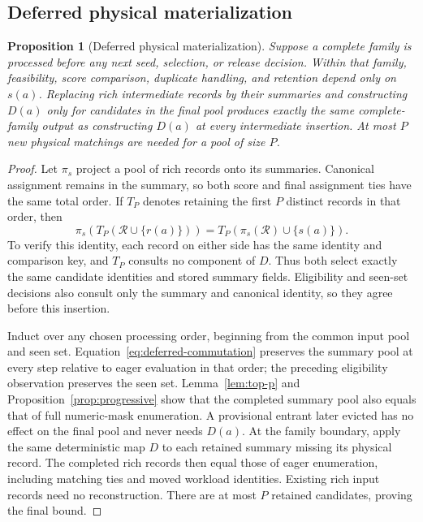 \documentclass[11pt]{article}
\newtheorem{proposition}{Proposition}
\begin{document}
\subsection{Deferred physical materialization}
\begin{proposition}[Deferred physical materialization]\label{prop:deferred}
Suppose a complete family is processed before any next seed, selection, or release decision. Within that family, feasibility, score comparison, duplicate handling, and retention depend only on $s(a)$. Replacing rich intermediate records by their summaries and constructing $D(a)$ only for candidates in the final pool produces exactly the same complete-family output as constructing $D(a)$ at every intermediate insertion. At most $P$ new physical matchings are needed for a pool of size $P$.
\end{proposition}
\begin{proof}
Let $\pi_s$ project a pool of rich records onto its summaries. Canonical assignment remains in the summary, so both score and final assignment ties have the same total order. If $T_P$ denotes retaining the first $P$ distinct records in that order, then
\begin{equation}
\pi_s\!\left(T_P(\mathcal R\cup\{r(a)\})\right)
=T_P\!\left(\pi_s(\mathcal R)\cup\{s(a)\}\right).
\label{eq:deferred-commutation}
\end{equation}
To verify this identity, each record on either side has the same identity and comparison key, and $T_P$ consults no component of $D$. Thus both select exactly the same candidate identities and stored summary fields. Eligibility and seen-set decisions also consult only the summary and canonical identity, so they agree before this insertion.

Induct over any chosen processing order, beginning from the common input pool and seen set. Equation~\eqref{eq:deferred-commutation} preserves the summary pool at every step relative to eager evaluation in that order; the preceding eligibility observation preserves the seen set. Lemma~\ref{lem:top-p} and Proposition~\ref{prop:progressive} show that the completed summary pool also equals that of full numeric-mask enumeration. A provisional entrant later evicted has no effect on the final pool and never needs $D(a)$. At the family boundary, apply the same deterministic map $D$ to each retained summary missing its physical record. The completed rich records then equal those of eager enumeration, including matching ties and moved workload identities. Existing rich input records need no reconstruction. There are at most $P$ retained candidates, proving the final bound.
\end{proof}
\end{document}
